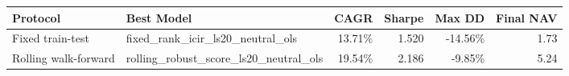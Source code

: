 \begin{tabular}{llrrrr}
\toprule
Protocol & Best Model & CAGR & Sharpe & Max DD & Final NAV \\
\midrule
Fixed train-test & fixed\_rank\_icir\_ls20\_neutral\_ols & 13.71\% & 1.520 & -14.56\% & 1.73 \\
Rolling walk-forward & rolling\_robust\_score\_ls20\_neutral\_ols & 19.54\% & 2.186 & -9.85\% & 5.24 \\
\bottomrule
\end{tabular}
